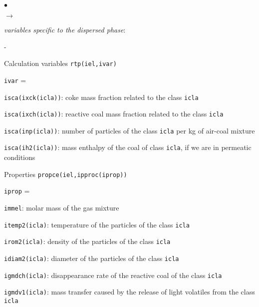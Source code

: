 {{{\begin{list}{$\bullet$}{}
\begin{list}{$\rightarrow$}{}
\begin{list}{}{}
              \item {\em variables specific to the dispersed phase}:
              \begin{list}{-}{}
               \item Calculation variables \texttt{rtp(iel,ivar)}
                     \begin{list}{\texttt{ivar} = }{}
                      \item \texttt{isca(ixck(icla))}: coke mass
                            fraction related to the class \texttt{icla}
                      \item \texttt{isca(ixch(icla))}: reactive coal
                            mass fraction related to the class \texttt{icla}
                      \item \texttt{isca(inp(icla))}: number of
                            particles of the class \texttt{icla} per kg of
                            air-coal mixture
                      \item \texttt{isca(ih2(icla))}: mass enthalpy of
                            the coal of class \texttt{icla}, if we are in
                            permeatic conditions
                     \end{list}
               \item Properties \texttt{propce(iel,ipproc(iprop))}
                     \begin{list}{\texttt{iprop} = }{}
                      \item \texttt{immel}: molar mass of the gas mixture
                      \item \texttt{itemp2(icla)}: temperature of
                            the particles of the class \texttt{icla}
                      \item \texttt{irom2(icla)}: density of
                            the particles of the class \texttt{icla}
                      \item \texttt{idiam2(icla)}: diameter of the
                            particles of the class \texttt{icla}
                      \item \texttt{igmdch(icla)}: disappearance
                            rate of the reactive coal of the class \texttt{icla}
                      \item \texttt{igmdv1(icla)}: mass transfer
                            caused by the release of light volatiles
                            from the class \texttt{icla}

\end{list}
\end{list}
\end{list}
\end{list}
\end{list}}}}
